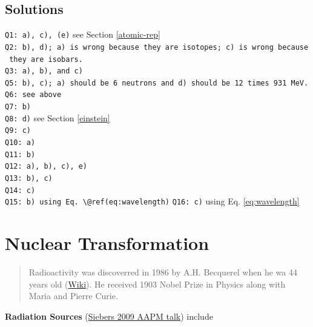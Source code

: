 \documentclass[]{book}
\theoremstyle{definition}
\theoremstyle{definition}
\theoremstyle{definition}
\theoremstyle{remark}
\begin{document}
\section{Solutions}\label{solutions}

\texttt{Q1:\ a),\ c),\ (e)} see Section \ref{atomic-rep}\\
\texttt{Q2:\ b),\ d);\ a)\ is\ wrong\ because\ they\ are\ isotopes;\ c)\ is\ wrong\ because\ they\ are\ isobars.}\\
\texttt{Q3:\ a),\ b),\ and\ c)}\\
\texttt{Q5:\ b),\ c);\ a)\ should\ be\ 6\ neutrons\ and\ d)\ should\ be\ 12\ times\ 931\ MeV.}\\
\texttt{Q6:\ see\ above}\\
\texttt{Q7:\ b)}\\
\texttt{Q8:\ d)} see Section \ref{einstein}\\
\texttt{Q9:\ c)}\\
\texttt{Q10:\ a)}\\
\texttt{Q11:\ b)}\\
\texttt{Q12:\ a),\ b),\ c),\ e)}\\
\texttt{Q13:\ b),\ c)}\\
\texttt{Q14:\ c)}\\
\texttt{Q15:\ b)\ using\ Eq.\ \textbackslash{}@ref(eq:wavelength)}
\texttt{Q16:\ c)} using Eq. \eqref{eq:wavelength}

\chapter{Nuclear Transformation}\label{nut}

\begin{quote}
Radioactivity was discoverred in 1986 by A.H. Becquerel when he wa 44
years old (\href{https://en.wikipedia.org/wiki/Henri_Becquerel}{Wiki}).
He received 1903 Nobel Prize in Physics along with Maria and Pierre
Curie.
\end{quote}

\textbf{Radiation Sources} (\href{https://vimeo.com/78875937}{Siebers
2009 AAPM talk}) include
\end{document}
